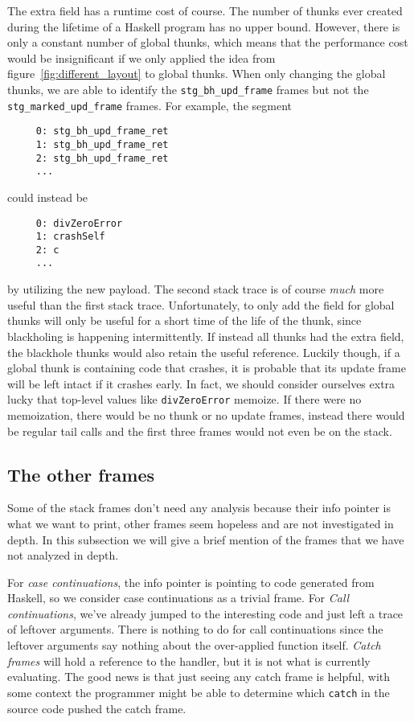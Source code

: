 The extra field has a runtime cost of course. The number of thunks
ever created during the lifetime of a Haskell program has no upper bound. However,
there is only a constant number of global thunks, which means that the
performance cost would be insignificant if we only applied the idea from
figure~\ref{fig:different_layout} to global thunks. When
only changing the global thunks, we are able to identify
the \texttt{stg\_bh\_upd\_frame} frames but not the
\texttt{stg\_marked\_upd\_frame} frames. For example, the
segment

\begin{verbatim}
     0: stg_bh_upd_frame_ret
     1: stg_bh_upd_frame_ret
     2: stg_bh_upd_frame_ret
     ...
\end{verbatim}

could instead be

\begin{verbatim}
     0: divZeroError
     1: crashSelf
     2: c
     ...
\end{verbatim}

by utilizing the new payload. The second stack trace is of course
\emph{much} more useful than the first stack trace. Unfortunately,
to only add the field for global thunks will only be useful for a
short time of the life of the thunk, since blackholing is happening
intermittently. If instead all thunks had the extra field, the blackhole
thunks would also retain the useful reference. Luckily though, if a
global thunk is containing code that crashes, it is probable that its
update frame will be left intact if it crashes early. In
fact, we should consider ourselves extra lucky that top-level values
like \texttt{divZeroError} memoize. If there were no memoization,
there would be no thunk or no update frames, instead there would be
regular tail calls and the first three frames would not even be on the stack.

\subsection{The other frames} \label{sec:the_other_frames}

Some of the stack frames don't need any analysis because their info
pointer is what we want to print, other frames seem hopeless and are not
investigated in depth. In this subsection we will give a brief mention
of the frames that we have not analyzed in depth.

For \emph{case continuations}, the info pointer is pointing to code
generated from Haskell, so we consider case continuations as a
trivial frame. For \emph{Call continuations}, we've already
jumped to the interesting code and just left a trace of leftover arguments.
There is nothing to do for call continuations since the leftover arguments
say nothing about the over-applied function itself.
\emph{Catch frames} will hold a reference to the handler, but it is
not what is currently evaluating. The good news is that just seeing
any catch frame is helpful, with some context the programmer might be
able to determine which \texttt{catch} in the source code pushed the
catch frame.

